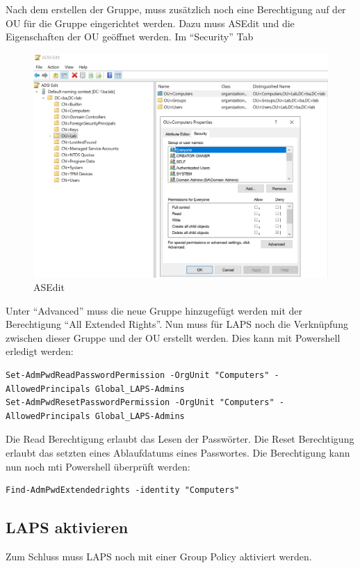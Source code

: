 Nach dem erstellen der Gruppe, muss zusätzlich noch eine Berechtigung auf der OU für die Gruppe eingerichtet werden.
Dazu muss ASEdit und die Eigenschaften der OU geöffnet werden. Im ``Security'' Tab 
\begin{figure}[H]
    \centering
    \includegraphics[width=0.7\linewidth]{../img/LAPS/ASEdit.png}
    \caption{ASEdit}
\end{figure}


Unter ``Advanced'' muss die neue Gruppe hinzugefügt werden mit der Berechtigung ``All Extended Rights''.
Nun muss für LAPS noch die Verknüpfung zwischen dieser Gruppe und der OU erstellt werden. 
Dies kann mit Powershell erledigt werden:
\begin{lstlisting}
Set-AdmPwdReadPasswordPermission -OrgUnit "Computers" -AllowedPrincipals Global_LAPS-Admins
Set-AdmPwdResetPasswordPermission -OrgUnit "Computers" -AllowedPrincipals Global_LAPS-Admins
\end{lstlisting}
Die Read Berechtigung erlaubt das Lesen der Passwörter. 
Die Reset Berechtigung erlaubt das setzten eines Ablaufdatums eines Passwortes.
Die Berechtigung kann nun noch mti Powershell überprüft werden:
\begin{lstlisting}
Find-AdmPwdExtendedrights -identity "Computers"
\end{lstlisting}


\subsection{LAPS aktivieren}
Zum Schluss muss LAPS noch mit einer Group Policy aktiviert werden.

%
%
%
%
%